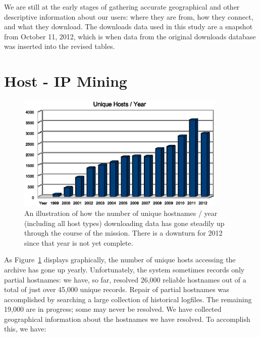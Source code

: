 \documentclass[11pt,twoside]{article}
\begin{document}
We are still at the early stages of gathering accurate geographical and other 
descriptive information about our users: where they are from, how they connect, and what they 
download. The downloads data used in this study are a snapshot from October 11, 2012, which 
is when data from the original downloads database was inserted into the revised tables.

\section{Host - IP Mining}

\begin{figure}[H]
\begin{center}
\includegraphics[width=100mm]{hosts_year.eps}
\end{center}
\caption{An illustration of how the number of unique hostnames / year (including all host
types) downloading data has gone steadily up through the course of the mission. There is a
downturn for 2012 since that year is not yet complete.}
\label{fig:HostsByYear}
\end{figure}

As Figure~\ref{fig:HostsByYear} displays graphically, the number of unique hosts accessing the archive
has gone up yearly. Unfortunately, the system sometimes records only partial hostnames: we have, so far, resolved 
26,000 reliable hostnames out of a total of just over 45,000 unique records. Repair of partial hostnames was 
accomplished by searching a large collection of historical logfiles. The remaining 19,000 are 
in progress; some may never be resolved. We have collected geographical information about the 
hostnames we have resolved. To accomplish this, we have:
\end{document}
